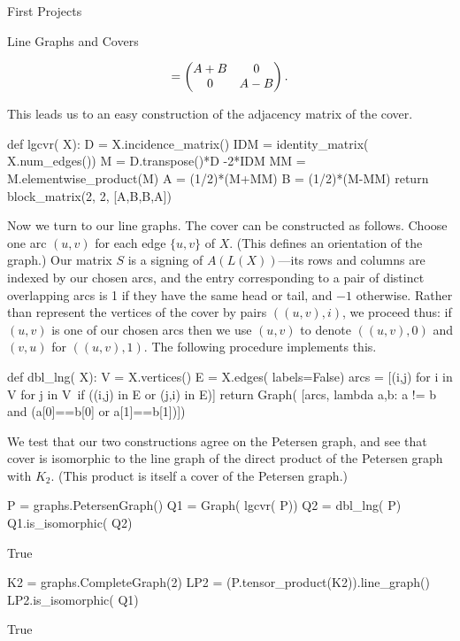 \begin{chap}{First Projects}
\begin{sect}{Line Graphs and Covers}
\begin{para}
\[        =\begin{pmatrix} A+B&0\\0&A-B \end{pmatrix}.
\]
\end{para}
%
\begin{para}
This leads us to an easy construction of the adjacency matrix of the cover.
\end{para}
%
\begin{sagecode}
\begin{sageinput}
def lgcvr( X):
    D = X.incidence_matrix()
    IDM = identity_matrix( X.num_edges())
    M = D.transpose()*D -2*IDM
    MM = M.elementwise_product(M)
    A = (1/2)*(M+MM)
    B = (1/2)*(M-MM)
    return block_matrix(2, 2, [A,B,B,A])
\end{sageinput}
\end{sagecode}
%
\begin{para}
Now we turn to our line graphs. The cover can be constructed as follows.
Choose one arc $(u,v)$ for each edge $\{u,v\}$ of $X$. (This defines an orientation
of the graph.) Our matrix $S$ is a signing of $A(L(X))$---its rows and columns
are indexed by our chosen arcs, and the entry corresponding to a pair
of distinct overlapping arcs is 1 if they have the same head or tail,
and $-1$ otherwise. Rather than represent the vertices of the cover by
pairs $((u,v),i)$, we proceed thus: if $(u,v)$ is one of our chosen
arcs then we use $(u,v)$ to denote $((u,v),0)$ and $(v,u)$ for $((u,v),1)$.
The following procedure implements this.
\end{para}
%
\begin{sagecode}
\begin{sageinput}
def dbl_lng( X):
    V = X.vertices()
    E = X.edges( labels=False)
    arcs = [(i,j) for i in V for j in V\
        if ((i,j) in E or (j,i) in E)]
    return  Graph( [arcs, lambda a,b: a != b and (a[0]==b[0] or a[1]==b[1])])
\end{sageinput}
\end{sagecode}
%
\begin{para}
We test that our two constructions agree on the Petersen graph, and see
that cover is isomorphic to the line graph of the direct product of
the Petersen graph with $K_2$. (This product is itself a cover of the Petersen
graph.)
\end{para}
%
\begin{sagecode}
\begin{sageinput}
P = graphs.PetersenGraph()
Q1 = Graph( lgcvr( P))
Q2 = dbl_lng( P)
Q1.is_isomorphic( Q2)
\end{sageinput}
\begin{sageoutput}
True
\end{sageoutput}
\end{sagecode}
%
\begin{sagecode}
\begin{sageinput}
K2 = graphs.CompleteGraph(2)
LP2 = (P.tensor_product(K2)).line_graph()
LP2.is_isomorphic( Q1)
\end{sageinput}
\begin{sageoutput}
True
\end{sageoutput}
\end{sagecode}
%
\end{sect}
%
\end{chap}